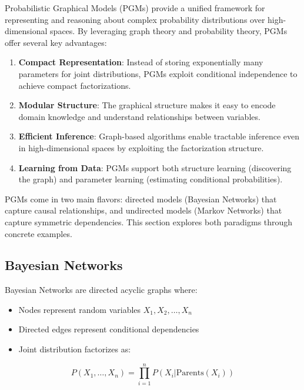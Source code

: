 \documentclass[conference]{IEEEtran}
\begin{document}
Probabilistic Graphical Models (PGMs) provide a unified framework for representing and reasoning about complex probability distributions over high-dimensional spaces. By leveraging graph theory and probability theory, PGMs offer several key advantages:

\begin{enumerate}
    \item \textbf{Compact Representation}: Instead of storing exponentially many parameters for joint distributions, PGMs exploit conditional independence to achieve compact factorizations.
    
    \item \textbf{Modular Structure}: The graphical structure makes it easy to encode domain knowledge and understand relationships between variables.
    
    \item \textbf{Efficient Inference}: Graph-based algorithms enable tractable inference even in high-dimensional spaces by exploiting the factorization structure.
    
    \item \textbf{Learning from Data}: PGMs support both structure learning (discovering the graph) and parameter learning (estimating conditional probabilities).
\end{enumerate}

PGMs come in two main flavors: directed models (Bayesian Networks) that capture causal relationships, and undirected models (Markov Networks) that capture symmetric dependencies. This section explores both paradigms through concrete examples.

\subsection{Bayesian Networks}

Bayesian Networks are directed acyclic graphs where:
\begin{itemize}
    \item Nodes represent random variables $X_1, X_2, \ldots, X_n$
    \item Directed edges represent conditional dependencies
    \item Joint distribution factorizes as:
\end{itemize}

\begin{equation}
P(X_1, \ldots, X_n) = \prod_{i=1}^{n} P(X_i | \text{Parents}(X_i))
\end{equation}
\end{document}
